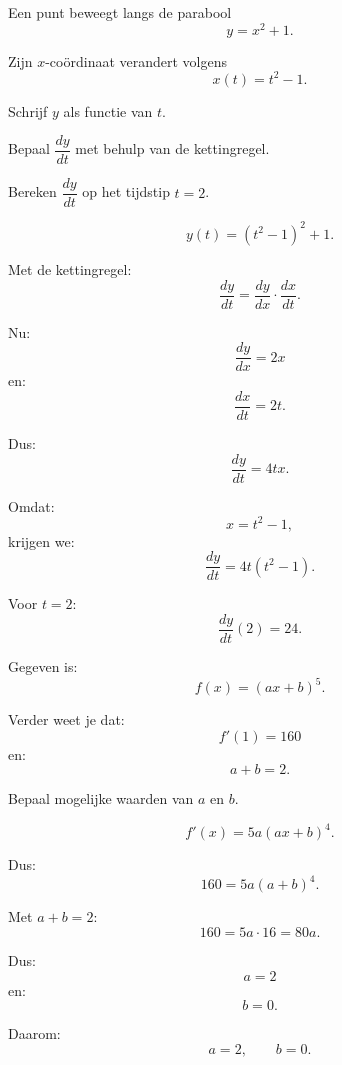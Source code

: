 \documentclass{ximera}
\begin{document}
\begin{oefening}{\oefU\ESS}

Een punt beweegt langs de parabool
\[
y=x^2+1.
\]

Zijn $x$-coördinaat verandert volgens
\[
x(t)=t^2-1.
\]

\begin{question}
Schrijf $y$ als functie van $t$.
\end{question}

\begin{question}
Bepaal $\dfrac{dy}{dt}$ met behulp van de kettingregel.
\end{question}

\begin{question}
Bereken $\dfrac{dy}{dt}$ op het tijdstip $t=2$.
\end{question}

\begin{oplossing}

\[
y(t)=(t^2-1)^2+1.
\]

Met de kettingregel:
\[
\frac{dy}{dt}
=
\frac{dy}{dx}\cdot\frac{dx}{dt}.
\]

Nu:
\[
\frac{dy}{dx}=2x
\]
en:
\[
\frac{dx}{dt}=2t.
\]

Dus:
\[
\frac{dy}{dt}=4tx.
\]

Omdat:
\[
x=t^2-1,
\]
krijgen we:
\[
\boxed{\frac{dy}{dt}=4t(t^2-1).}
\]

Voor $t=2$:
\[
\boxed{\frac{dy}{dt}(2)=24.}
\]

\end{oplossing}

\end{oefening}




\begin{oefening}{\oefG}

Gegeven is:
\[
f(x)=(ax+b)^5.
\]

Verder weet je dat:
\[
f'(1)=160
\]
en:
\[
a+b=2.
\]

Bepaal mogelijke waarden van $a$ en $b$.

\begin{oplossing}

\[
f'(x)=5a(ax+b)^4.
\]

Dus:
\[
160=5a(a+b)^4.
\]

Met $a+b=2$:
\[
160=5a\cdot16=80a.
\]

Dus:
\[
a=2
\]
en:
\[
b=0.
\]

Daarom:
\[
\boxed{a=2,\qquad b=0.}
\]

\end{oplossing}

\end{oefening}
\end{document}
